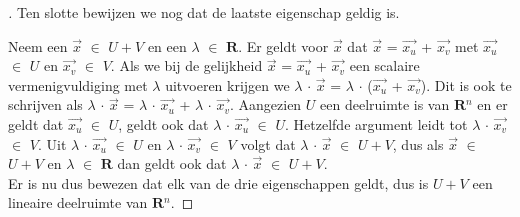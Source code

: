\documentclass[12pt, a4paper]{article}
\begin{document}
\begin{enumerate}[(a.)]
\begin{proof}[\unskip\nopunct]
Ten slotte bewijzen we nog dat de laatste eigenschap geldig is. 

Neem een $\vec{x}$ $\in$ $U + V$ en een $\lambda$ $\in$ $\mathbf{R}$. Er geldt voor $\vec{x}$ dat $\vec{x}$ = $\vec{x_{u}}$ + $\vec{x_{v}}$ met $\vec{x_{u}}$ $\in$ $U$ en $\vec{x_{v}}$ $\in$ $V$. Als we bij de gelijkheid $\vec{x}$ = $\vec{x_{u}}$ + $\vec{x_{v}}$ een scalaire vermenigvuldiging met $\lambda$ uitvoeren krijgen we $\lambda$ $\cdot$ $\vec{x}$ = $\lambda$ $\cdot$ ($\vec{x_{u}}$ + $\vec{x_{v}}$). Dit is ook te schrijven als $\lambda$ $\cdot$ $\vec{x}$ = $\lambda$ $\cdot$ $\vec{x_{u}}$ + $\lambda$ $\cdot$ $\vec{x_{v}}$. Aangezien $U$ een deelruimte is van $\mathbf{R}$$^n$ en er geldt dat $\vec{x_{u}}$ $\in$ $U$, geldt ook dat $\lambda$ $\cdot$ $\vec{x_{u}}$ $\in$ $U$. Hetzelfde argument leidt tot $\lambda$ $\cdot$ $\vec{x_{v}}$ $\in$ $V$. Uit $\lambda$ $\cdot$ $\vec{x_{u}}$ $\in$ $U$ en $\lambda$ $\cdot$ $\vec{x_{v}}$ $\in$ $V$ volgt dat $\lambda$ $\cdot$ $\vec{x}$ $\in$ $U + V$, dus als $\vec{x}$ $\in$ $U + V$ en $\lambda$ $\in$ $\mathbf{R}$ dan geldt ook dat $\lambda$ $\cdot$ $\vec{x}$ $\in$ $U + V$. \\

Er is nu dus bewezen dat elk van de drie eigenschappen geldt, dus is $U + V$ een lineaire deelruimte van $\mathbf{R}$$^n$.\end{proof} 
\end{enumerate}
\end{document}
